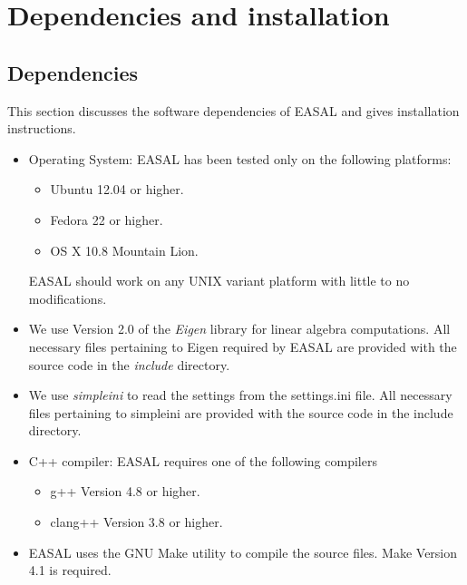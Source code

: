 \documentclass[10pt]{article}
\begin{document}
\section{Dependencies and installation}
\label{sec:dependency}
\subsection{Dependencies}
This section discusses the software dependencies of EASAL and gives installation instructions.

\begin{itemize} 
  \item Operating System: EASAL has been tested only on the following platforms:
	\begin{itemize}
	\item Ubuntu 12.04 or higher.
	\item Fedora 22 or higher.
	\item OS X 10.8 Mountain Lion.
	\end{itemize}
	  EASAL should work on any UNIX variant platform with little to no modifications.

  \item We use Version 2.0 of the \emph{Eigen} library for linear algebra
		  computations. All necessary files pertaining to Eigen required by
		  EASAL are provided with the source code in the \emph{include}
		  directory.  
   
  \item We use \emph{simpleini} to read the settings from the
		  settings.ini file. All necessary files pertaining to simpleini are
		  provided with the source code in the include directory.
   
  \item C++ compiler: EASAL requires one of the following compilers
		  \begin{itemize}
		  	\item g++ Version 4.8 or higher.
		  	\item clang++ Version 3.8 or higher.
		  \end{itemize}
		  
  \item EASAL uses the GNU Make utility to compile the source files. Make
		  Version 4.1 is required.
\end{itemize}

 
\end{document}
